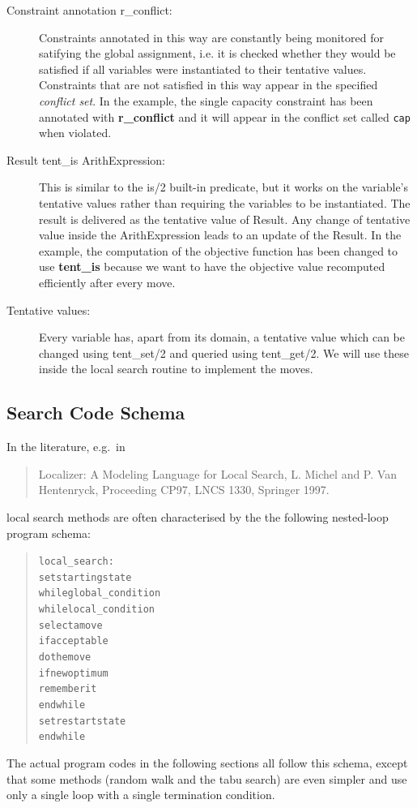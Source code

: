 \begin{description}
\item[Constraint annotation r\_conflict:] Constraints annotated in this
        way are constantly being monitored for satifying the global
        assignment, i.e. it is checked whether they would be satisfied
        if all variables were instantiated to their tentative values.
        Constraints that are not satisfied in this way appear in the
        specified {\em conflict set}.
        In the example, the single capacity constraint has been annotated with
        {\bf r\_conflict} and it will appear in the conflict set called
        {\tt cap} when violated.
\item[Result tent\_is ArithExpression:] This is similar to the is/2 built-in
        predicate, but it works on the variable's tentative values rather
        than requiring the variables to be instantiated. The result is
        delivered as the tentative value of Result. Any change of tentative
        value inside the ArithExpression leads to an update of the Result.
        In the example, the computation of the objective function has
        been changed to use {\bf tent\_is} because we want to have the
        objective value recomputed efficiently after every move.
\item[Tentative values:] Every variable has, apart from its domain,
        a tentative value which can be changed using tent\_set/2 and
        queried using tent\_get/2. We will use these inside the local search
        routine to implement the moves.
\end{description}


\newpage
\subsection{Search Code Schema}

In the literature, e.g.\ in
\begin{quote}
Localizer: A Modeling Language for Local Search,
L. Michel and P. Van Hentenryck, Proceeding CP97, LNCS 1330, Springer 1997.
\end{quote}
local search methods are often characterised by
the the following nested-loop program schema:
\begin{quote}\begin{alltt}
local_search:
     set starting state
     while global_condition
         while local_condition
             select a move
             if acceptable
                 do the move
                 if new optimum
                     remember it
         endwhile
         set restart state
     endwhile
\end{alltt}\end{quote}
The actual program codes in the following sections all follow this schema,
except that some methods (random walk and the tabu search)
are even simpler and use only a single loop with a single termination
condition.


